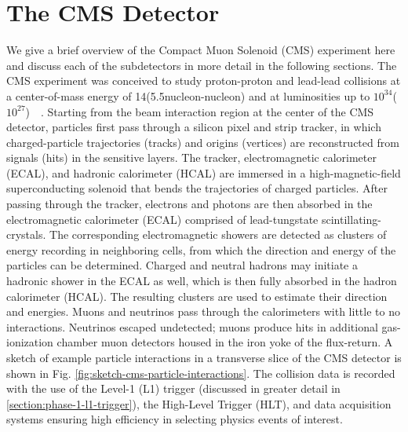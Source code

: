 \section{The CMS Detector}
\label{section:cms-detector}
We give a brief overview of the Compact Muon Solenoid (CMS) experiment here and discuss each of the subdetectors in more detail in the following sections. The CMS experiment was conceived to study proton-proton and lead-lead collisions at a center-of-mass energy of 14\TeV (5.5\TeV nucleon-nucleon) and at luminosities up to $10^{34}$\percms ($10^{27}$\percms)~\cite{CMS-2008-JINST-3-S08004}~\cite{CERN-EP-2017-110}. Starting from the beam interaction region at the center of the CMS detector, particles first pass through a silicon pixel and strip tracker, in which charged-particle trajectories (tracks) and origins (vertices) are reconstructed from signals (hits) in the sensitive layers. The tracker, electromagnetic calorimeter (ECAL), and hadronic calorimeter (HCAL) are immersed in a high-magnetic-field superconducting solenoid that bends the trajectories of charged particles. After passing through the tracker, electrons and photons are then absorbed in the electromagnetic calorimeter (ECAL) comprised of lead-tungstate scintillating-crystals. The corresponding electromagnetic showers are detected as clusters of energy recording in neighboring cells, from which the direction and energy of the particles can be determined. Charged and neutral hadrons may initiate a hadronic shower in the ECAL as well, which is then fully absorbed in the hadron calorimeter (HCAL). The resulting clusters are used to estimate their direction and energies. Muons and neutrinos pass through the calorimeters with little to no interactions. Neutrinos escaped undetected; muons produce hits in additional gas-ionization chamber muon detectors housed in the iron yoke of the flux-return. A sketch of example particle interactions in a transverse slice of the CMS detector is shown in Fig. \ref{fig:sketch-cms-particle-interactions}. The collision data is recorded with the use of the Level-1 (L1) trigger (discussed in greater detail in \ref{section:phase-1-l1-trigger}), the High-Level Trigger (HLT), and data acquisition systems ensuring high efficiency in selecting physics events of interest. 

